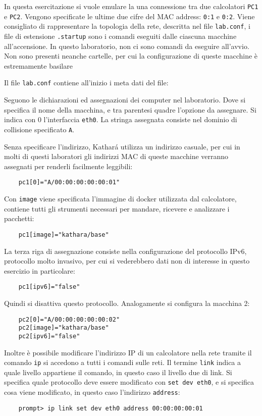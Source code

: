 \documentclass{article}
\numberwithin{equation}{subsection}
\begin{document}
In questa esercitazione si vuole emulare la una connessione tra due calcolatori \verb|PC1| e \verb|PC2|. Vengono 
specificate le ultime due cifre del MAC address: \verb|0:1| e \verb|0:2|. 
Viene consigliato di rappresentare la topologia della rete, descritta nel file \verb|lab.conf|, i file di estensione \verb|.startup| sono i 
comandi eseguiti dalle ciascuna macchine all'accensione. In questo laboratorio, non ci sono comandi da eseguire all'avvio. Non sono presenti 
neanche cartelle, per cui la configurazione di queste macchine è estremamente basilare



Il file \verb|lab.conf| contiene all'inizio i meta dati del file:

Seguono le dichiarazioni ed assegnazioni dei computer nel laboratorio. Dove si 
specifica il nome della macchina, e tra parentesi quadre l'opzione da assegnare. 
Si indica con $0$ l'interfaccia \verb|eth0|. La stringa assegnata consiste nel 
dominio di collisione specificato \verb|A|. 

Senza specificare l'indirizzo, Kathar\'{a} utilizza un indirizzo casuale, per cui 
in molti di questi laboratori gli indirizzi MAC di queste macchine verranno 
assegnati per renderli facilmente leggibili:

\begin{verbatim}
    pc1[0]="A/00:00:00:00:00:01"
\end{verbatim}

Con \verb|image| viene specificata l'immagine di docker utilizzata dal calcolatore, 
contiene tutti gli strumenti necessari per mandare, ricevere e analizzare i pacchetti: 
\begin{verbatim}
    pc1[image]="kathara/base"
\end{verbatim}
La terza riga di assegnazione consiste nella configurazione del protocollo 
IPv6, protocollo molto invasivo, per cui si vederebbero dati non di interesse 
in questo esercizio in particolare:
\begin{verbatim}
    pc1[ipv6]="false"
\end{verbatim} 
Quindi si disattiva questo protocollo. Analogamente 
si configura la macchina 2:
\begin{verbatim}
    pc2[0]="A/00:00:00:00:00:02"
    pc2[image]="kathara/base"
    pc2[ipv6]="false"
\end{verbatim}
Inoltre è possibile modificare l'indirizzo IP di un calcolatore nella rete 
tramite il comando \verb|ip| si accedono a tutti i comandi sulle reti. 
Il termine \verb|link| indica a quale livello appartiene il comando, in questo caso il livello due di link. 
Si specifica quale protocollo deve essere modificato con \verb|set dev eth0|, e si specifica cosa viene modificato, in questo caso l'indirizzo \verb|address|:
\begin{verbatim}
    prompt> ip link set dev eth0 address 00:00:00:00:01
\end{verbatim}
\end{document}
